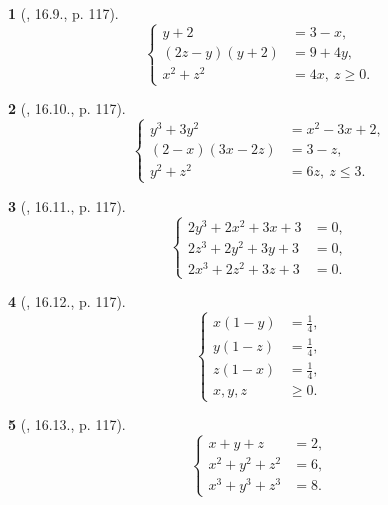 \documentclass{article}
\newtheorem{baitoan}{}
\begin{document}
\begin{baitoan}[\cite{TLCT_THCS_Toan_9_dai_so}, 16.9., p. 117]
	\begin{equation*}
		\left\{\begin{split}
			y + 2 &= 3 - x,\\
			(2z - y)(y + 2) &= 9 + 4y,\\
			x^2 + z^2 &= 4x,\ z\ge0.
		\end{split}\right.
	\end{equation*}
\end{baitoan}

\begin{baitoan}[\cite{TLCT_THCS_Toan_9_dai_so}, 16.10., p. 117]
	\begin{equation*}
		\left\{\begin{split}
			y^3 + 3y^2 &= x^2 - 3x + 2,\\
			(2 - x)(3x - 2z) &= 3 - z,\\
			y^2 + z^2 &= 6z,\ z\le3.
		\end{split}\right.
	\end{equation*}
\end{baitoan}

\begin{baitoan}[\cite{TLCT_THCS_Toan_9_dai_so}, 16.11., p. 117]
	\begin{equation*}
		\left\{\begin{split}
			2y^3 + 2x^2 + 3x + 3 &= 0,\\
			2z^3 + 2y^2 + 3y + 3 &= 0,\\
			2x^3 + 2z^2 + 3z + 3 &= 0.
		\end{split}\right.
	\end{equation*}
\end{baitoan}

\begin{baitoan}[\cite{TLCT_THCS_Toan_9_dai_so}, 16.12., p. 117]
	\begin{equation*}
		\left\{\begin{split}
			x(1 - y) &= \frac{1}{4},\\
			y(1 - z) &= \frac{1}{4},\\
			z(1 - x) &= \frac{1}{4},\\
			x,y,z&\ge0.
		\end{split}\right.
	\end{equation*}
\end{baitoan}

\begin{baitoan}[\cite{TLCT_THCS_Toan_9_dai_so}, 16.13., p. 117]
	\begin{equation*}
		\left\{\begin{split}
			x + y + z &= 2,\\
			x^2 + y^2 + z^2 &= 6,\\
			x^3 + y^3 + z^3 &= 8.
		\end{split}\right.
	\end{equation*}
\end{baitoan}
\end{document}
